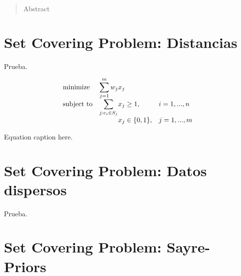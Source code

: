 \documentclass[spanish]{article}
\begin{document}
	\maketitle %

	\thispagestyle{fancy} %



	\begin{abstract}
		\noindent Abstract
	\end{abstract}



  \section{Set Covering Problem: Distancias}

    \paragraph{}
		Prueba.

		\begin{eqfloat}
			\begin{equation}
				\begin{array}{ll@{}ll}
				\text{minimize}  & \displaystyle\sum\limits_{j=1}^{m} w_{j}&x_{j} &\\
				\text{subject to}& \displaystyle\sum\limits_{j:e_{i} \in S_{j}}   &x_{j} \geq 1,  &i=1 ,..., n\\
												 &                                                &x_{j} \in \{0,1\}, &j=1 ,..., m
				\end{array}
			\end{equation}
      \caption{Equation caption here.}
      \label{eq:set_covering}
    \end{eqfloat}

	\section{Set Covering Problem: Datos dispersos}

    \paragraph{}
		Prueba.



	\section{Set Covering Problem: Sayre-Priors}
\end{document}
